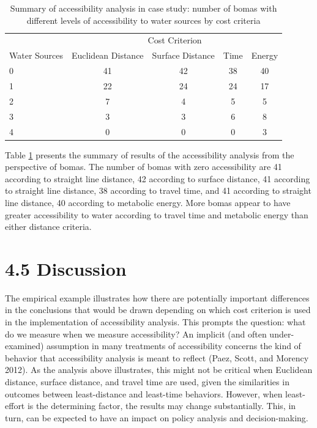 \documentclass[]{elsarticle} %
\begin{document}
\begin{table}[t]

\caption{\label{tab:table-summary-accessibility}\label{tab:table-summary-accessibility}Summary of accessibility analysis in case study: number of bomas with different levels of accessibility to water sources by cost criteria}
\centering
\begin{tabular}{lcccc}
\toprule
\multicolumn{1}{c}{} & \multicolumn{4}{c}{Cost Criterion} \\
\cmidrule(l{3pt}r{3pt}){2-5}
Water Sources & Euclidean Distance & Surface Distance & Time & Energy\\
\midrule
0 & 41 & 42 & 38 & 40\\
1 & 22 & 24 & 24 & 17\\
2 & 7 & 4 & 5 & 5\\
3 & 3 & 3 & 6 & 8\\
4 & 0 & 0 & 0 & 3\\
\bottomrule
\end{tabular}
\end{table}

Table \ref{tab:table-summary-accessibility} presents the summary of
results of the accessibility analysis from the perspective of bomas. The
number of bomas with zero accessibility are 41 according to straight
line distance, 42 according to surface distance, 41 according to
straight line distance, 38 according to travel time, and 41 according to
straight line distance, 40 according to metabolic energy. More bomas
appear to have greater accessibility to water according to travel time
and metabolic energy than either distance criteria.

\hypertarget{discussion}{%
\section{4.5 Discussion}\label{discussion}}

The empirical example illustrates how there are potentially important
differences in the conclusions that would be drawn depending on which
cost criterion is used in the implementation of accessibility analysis.
This prompts the question: what do we measure when we measure
accessibility? An implicit (and often under-examined) assumption in many
treatments of accessibility concerns the kind of behavior that
accessibility analysis is meant to reflect (Paez, Scott, and Morency
2012). As the analysis above illustrates, this might not be critical
when Euclidean distance, surface distance, and travel time are used,
given the similarities in outcomes between least-distance and least-time
behaviors. However, when least-effort is the determining factor, the
results may change substantially. This, in turn, can be expected to have
an impact on policy analysis and decision-making.
\end{document}
